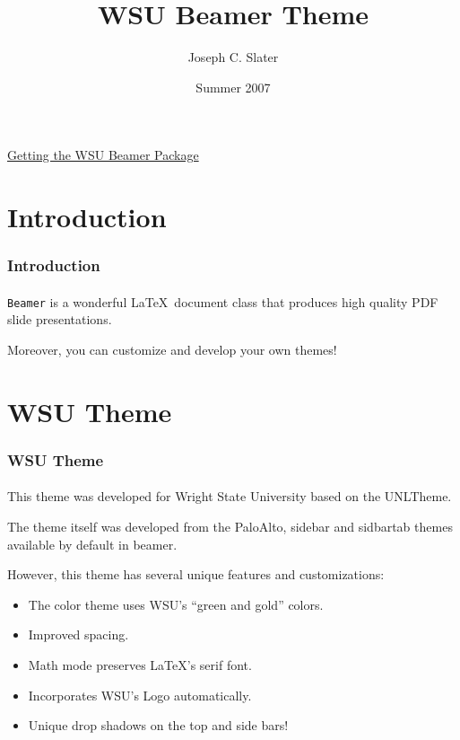 \documentclass{beamer}
\title{WSU Beamer Theme}
\author{Joseph C. Slater} %
\institute{Wright State University}
\date{Summer 2007}
\begin{document}
\begin{frame}
        \titlepage
        \begin{center}
    \href{http://www.cs.wright.edu/~jslater/classes/Thesis-Dissertation.html}{Getting the WSU Beamer Package}
        \end{center}
\end{frame}


\section{Introduction}

\begin{frame}
    \frametitle{Introduction}
    \framesubtitle{}

    \texttt{Beamer} is a wonderful \LaTeX\ document class that produces
    high quality PDF slide presentations.
    
    Moreover, you can customize and develop your own themes!

\end{frame}

\section{WSU Theme}    

\begin{frame}
    \frametitle{WSU Theme}
    \framesubtitle{}

    This theme was developed for Wright State University based on the UNLTheme.
    
    The theme itself was developed from the PaloAlto, sidebar and sidbartab
    themes available by default in beamer.
    
    However, this theme has several unique features and customizations:
    \begin{itemize}
      \item The color theme uses WSU's ``green and gold'' colors.
      \item Improved spacing.
      \item Math mode preserves \LaTeX's serif font.
      \item Incorporates WSU's Logo automatically.
      \item Unique drop shadows on the top and side bars!
    \end{itemize}

\end{frame}
\end{document}
